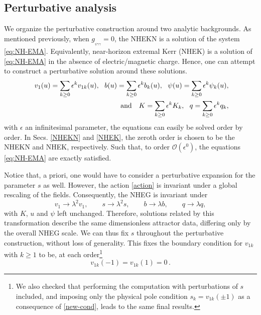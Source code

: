 \documentclass[11pt]{article}
\numberwithin{equation}{section} %
\begin{document}
\subsection{Perturbative analysis}\label{sec:perturbar}

We organize the perturbative construction around two analytic backgrounds. As mentioned previously, when $g_{_{\psi\gamma\gamma}}=0$, the NHEKN is a solution of the system \eqref{eq:NH-EMA}. Equivalently, near-horizon extremal Kerr (NHEK) is a solution of \eqref{eq:NH-EMA} in the absence of electric/magnetic charge. Hence, one can attempt to construct a perturbative solution around these solutions.
%
\begin{eqnarray} 
&&
v_1(u)= \sum_{ k\geq 0} \epsilon^k v_{1k}(u),~~
b (u)= \sum_{ k\geq 0} \epsilon^k 
b_{k}(u),~~
\psi (u)= \sum_{ k\geq 0} \epsilon^k \psi_k(u),~~
 \\
 \nonumber
 &&
{\rm and}~~~
K= \sum_{ k\geq 0} \epsilon^k  K_k ,~~
 q= \sum_{ k\geq 0} \epsilon^k q_k ,~~
\end{eqnarray}  
%
with $\epsilon$ an infinitesimal parameter, the equations can easily be solved order by order. In Secs. \ref{NHEKN} and \ref{NHEK}, the zeroth order is chosen to be the NHEKN and NHEK, respectively. Such that, to order $\mathcal{O}(\epsilon^0)$, the equations \eqref{eq:NH-EMA} are exactly satisfied.


Notice that, a priori, one would have to consider a perturbative expansion for the parameter \(s\) as well. However, the action \eqref{action} is invariant under a global rescaling of the fields. Consequently, the NHEG is invariant under
\begin{equation}
        v_{1}\rightarrow \lambda^{2}v_{1},\qquad
        s\rightarrow \lambda^{2}s,\qquad
        b\rightarrow \lambda b,\qquad
        q\rightarrow \lambda q ,
\end{equation}
%
with \(K\), \(u\) and \(\psi\) left unchanged. Therefore, solutions related by this transformation describe the same dimensionless attractor data, differing only by the overall NHEG scale. We can thus fix \(s\) throughout the perturbative construction, without loss of generality. This fixes the boundary condition for $v_{1k}$ with $k\ge 1$ to be, at each order\footnote{We also checked that performing the computation with perturbations of \(s\) included, and imposing only the physical pole condition \(s_k=v_{1k}(\pm1)\) as a consequence of \eqref{new-cond}, leads to the same final results.}
%
\begin{equation}
    v_{1k}(-1)=v_{1k}(1)=0\,.
\end{equation}
\end{document}
